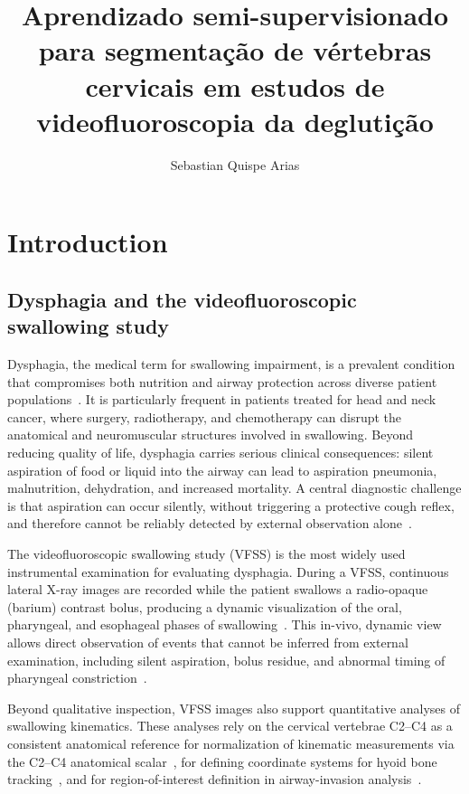\documentclass[
  msc,
  american
]{ThesisPUC_v2}
\author{Sebastian Quispe Arias}
\title{Aprendizado semi-supervisionado para segmenta\c{c}\~{a}o de
  v\'{e}rtebras cervicais em estudos de videofluoroscopia da
  degluti\c{c}\~{a}o}
\begin{document}

\chapter{Introduction}
\label{chap:intro}

\section{Dysphagia and the videofluoroscopic swallowing study}
\label{sec:intro-background}

Dysphagia, the medical term for swallowing impairment, is a prevalent condition that compromises both nutrition and airway protection across diverse patient populations~\citep{ref_logemann}. It is particularly frequent in patients treated for head and neck cancer, where surgery, radiotherapy, and chemotherapy can disrupt the anatomical and neuromuscular structures involved in swallowing. Beyond reducing quality of life, dysphagia carries serious clinical consequences: silent aspiration of food or liquid into the airway can lead to aspiration pneumonia, malnutrition, dehydration, and increased mortality. A central diagnostic challenge is that aspiration can occur silently, without triggering a protective cough reflex, and therefore cannot be reliably detected by external observation alone~\citep{ref_smith1999_silent}.

The videofluoroscopic swallowing study (VFSS) is the most widely used instrumental examination for evaluating dysphagia. During a VFSS, continuous lateral X-ray images are recorded while the patient swallows a radio-opaque (barium) contrast bolus, producing a dynamic visualization of the oral, pharyngeal, and esophageal phases of swallowing~\citep{ref_kendall2000}. This in-vivo, dynamic view allows direct observation of events that cannot be inferred from external examination, including silent aspiration, bolus residue, and abnormal timing of pharyngeal constriction~\citep{ref_shu_review}.

Beyond qualitative inspection, VFSS images also support quantitative analyses of swallowing kinematics. These analyses rely on the cervical vertebrae C2--C4 as a consistent anatomical reference for normalization of kinematic measurements via the C2--C4 anatomical scalar~\citep{ref_molfenter,ref_steele_norms}, for defining coordinate systems for hyoid bone tracking~\citep{ref_kim2021}, and for region-of-interest definition in airway-invasion analysis~\citep{ref_lee2020}.
\end{document}
